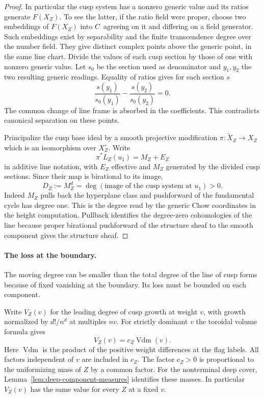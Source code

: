 \begin{proof}
In particular the cusp system has a nonzero generic value
and its ratios generate \(F(X_Z)\). To see the latter, if
the ratio field were proper, choose two embeddings of
\(F(X_Z)\) into \(C\) agreeing on it and differing on a
field generator. Such embeddings exist by separability and
the finite transcendence degree over the number field.
They give distinct complex points above the generic point,
in the same line chart. Divide the values of each cusp
section by those of one with nonzero generic value. Let \(s_0\) be the section used as denominator and \(y_1,y_2\) the two resulting generic readings. Equality of ratios gives for each section \(s\)
\[
 \frac{s(y_1)}{s_0(y_1)}-\frac{s(y_2)}{s_0(y_2)}=0.
\]
The common change of line frame
is absorbed in the coefficients. This contradicts canonical
separation on these points.

Principalize the cusp base ideal by a smooth projective
modification \(\pi\colon\widetilde X_Z\to X_Z\) which is an
isomorphism over \(X_Z^\circ\). Write
\[
 \pi^*L_Z(u_1)=M_Z+E_Z
\]
in additive line notation, with
\(E_Z\) effective and \(M_Z\) generated by the divided cusp
sections. Since their map is birational to its image,
\[
 D_Z:=M_Z^d=\deg(\text{image of the cusp system at }u_1)>0 .
\]
Indeed \(M_Z\) pulls back the hyperplane class and pushforward
of the fundamental cycle has degree one. This is the degree
read by the generic Chow coordinates in the height computation.
Pullback identifies the degree-zero cohomologies of the
line because proper birational pushforward of the structure
sheaf to the smooth component gives the structure sheaf.

\end{proof}

\paragraph{The loss at the boundary.}

The moving degree can be smaller than the total degree of the line of cusp forms because of fixed vanishing at the boundary. Its loss must be bounded on each component.

Write \(V_Z(v)\) for the leading degree of cusp growth at
weight \(v\), with growth normalized by \(d!/n^d\) at
multiples \(nv\). For strictly dominant \(v\) the toroidal volume formula gives
\[
                          V_Z(v)=c_Z\operatorname{Vdm}(v).
\]
Here \(\operatorname{Vdm}\) is the product of the positive
weight differences at the flag labels. All factors independent of \(v\) are included in \(c_Z\). The factor \(c_Z>0\) is proportional to the
uniformizing mass of \(Z\) by a common factor. For the nonterminal deep cover, Lemma~\ref{lem:deep-component-measures} identifies these masses.
In particular \(V_Z(v)\) has the same value for every \(Z\)
at a fixed \(v\).

